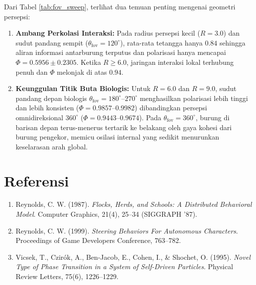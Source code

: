 \documentclass[11pt,a4paper]{article}
\begin{document}
Dari Tabel \ref{tab:fov_sweep}, terlihat dua temuan penting mengenai geometri persepsi:
\begin{enumerate}
    \item \textbf{Ambang Perkolasi Interaksi:} Pada radius persepsi kecil ($R = 3.0$) dan sudut pandang sempit ($\theta_{\text{fov}} = 120^\circ$), rata-rata tetangga hanya $0.84$ sehingga aliran informasi antarburung terputus dan polarisasi hanya mencapai $\Phi = 0.5956 \pm 0.2305$. Ketika $R \ge 6.0$, jaringan interaksi lokal terhubung penuh dan $\Phi$ melonjak di atas $0.94$.
    \item \textbf{Keunggulan Titik Buta Biologis:} Untuk $R = 6.0$ dan $R = 9.0$, sudut pandang depan biologis $\theta_{\text{fov}} = 180^\circ$--$270^\circ$ menghasilkan polarisasi lebih tinggi dan lebih konsisten ($\Phi = 0.9857$--$0.9982$) dibandingkan persepsi omnidireksional $360^\circ$ ($\Phi = 0.9443$--$0.9674$). Pada $\theta_{\text{fov}} = 360^\circ$, burung di barisan depan terus-menerus tertarik ke belakang oleh gaya kohesi dari burung pengekor, memicu osilasi internal yang sedikit menurunkan keselarasan arah global.
\end{enumerate}

\section*{Referensi}
\begin{enumerate}
    \item Reynolds, C. W. (1987). \textit{Flocks, Herds, and Schools: A Distributed Behavioral Model}. Computer Graphics, 21(4), 25--34 (SIGGRAPH '87).
    \item Reynolds, C. W. (1999). \textit{Steering Behaviors For Autonomous Characters}. Proceedings of Game Developers Conference, 763--782.
    \item Vicsek, T., Czir\'ok, A., Ben-Jacob, E., Cohen, I., \& Shochet, O. (1995). \textit{Novel Type of Phase Transition in a System of Self-Driven Particles}. Physical Review Letters, 75(6), 1226--1229.
\end{enumerate}
\end{document}
